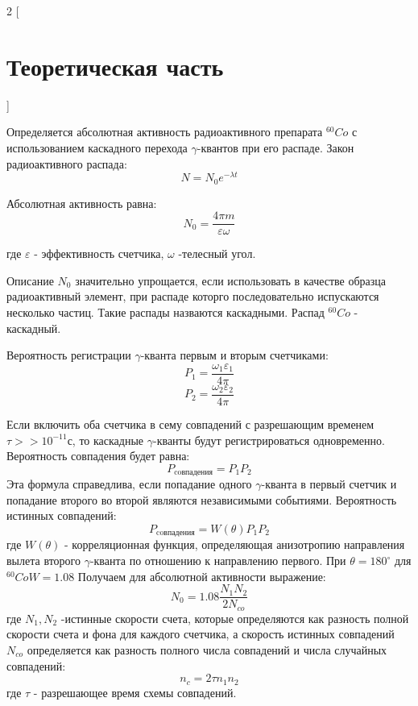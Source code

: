 \documentclass[a4paper,12pt]{article}
\theoremstyle{plain} %
\theoremstyle{definition} %
\theoremstyle{remark} %
\begin{document}
\begin{multicols}{2}
[
\section{Теоретическая часть}
]



Определяется абсолютная активность радиоактивного препарата $^{60}Co$ с использованием каскадного перехода $\gamma$-квантов при его распаде. 
Закон радиоактивного распада:
	$$N=N_0e^{-\lambda t}$$
\par Абсолютная активность равна:
	$$N_0=\frac{4\pi m}{\varepsilon \omega}$$

где $\varepsilon$ - эффективность счетчика, $\omega$ -телесный угол.

\par
Описание $N_0$ значительно упрощается, если использовать в качестве образца радиоактивный элемент, при распаде которго последовательно испускаются несколько частиц.  Такие распады назваются каскадными. Распад $^{60}Co$ - каскадный.


Вероятность регистрации $\gamma$-кванта первым и вторым счетчиками:
$$P_1=\frac{\omega _1 \varepsilon _1}{4 \pi}$$
$$P_2=\frac{\omega _2 \varepsilon _2}{4 \pi}$$

Если включить оба счетчика в сему совпадений с разрешающим временем $\tau >> 10^{-11}$с, то каскадные $\gamma$-кванты будут регистрироваться одновременно. Вероятность совпадения будет равна:
	$$P_{\text{coвпадения}}=P_1P_2$$ 
Эта формула справедлива, если попадание одного $\gamma$-кванта  в первый счетчик и попадание второго во второй являются независимыми событиями. 
Вероятность истинных совпадений:
	$$P_{\text{coвпадения}}=W(\theta)P_1P_2$$ 
где $W(\theta)$ - корреляционная функция, определяющая анизотропию направления вылета второго $\gamma$-кванта по отношению к направлению первого. При $\theta = 180^{\circ}$ для $^{60}Co W=1.08$
Получаем для абсолютной активности выражение:
	$$N_0=1.08 \frac{N_1N_2}{2N_{co}}$$
где $N_1, N_2$ -истинные скорости счета, которые определяются как разность полной скорости счета и фона для каждого счетчика, а скорость истинных совпадений $N_{co}$ определяется как разность полного числа совпадений и числа случайных совпадений:
	$$n_c = 2 \tau n_1 n_2$$
где $\tau$ - разрешающее время схемы совпадений.
\end{multicols}
\end{document}
